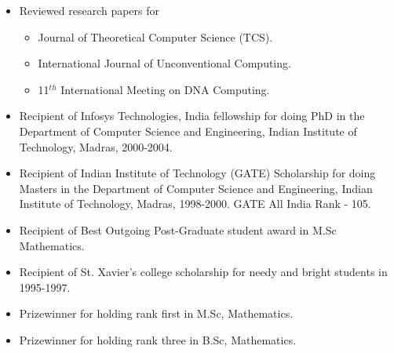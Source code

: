 \documentclass[11pt]{article}
\begin{document}
\begin{itemize}
\item Reviewed research papers for 
\begin{itemize}
\item Journal of Theoretical Computer Science (TCS).
\item International Journal of Unconventional Computing.
\item 11$^{th}$ International Meeting on DNA Computing. 
\end{itemize}
\item Recipient of Infosys Technologies, India fellowship for doing
PhD in the Department of Computer Science and Engineering, Indian
Institute of Technology, Madras, 2000-2004.
\item Recipient of Indian Institute of Technology (GATE) Scholarship
for doing Masters in the Department of Computer Science and
Engineering, Indian Institute of Technology, Madras, 1998-2000. GATE
All India Rank - 105.
\item Recipient of Best Outgoing Post-Graduate student award in M.Sc Mathematics.
\item Recipient of St. Xavier's college scholarship for needy and bright students in 1995-1997.
\item Prizewinner for holding rank first in M.Sc, Mathematics.
\item Prizewinner for holding rank three in B.Sc, Mathematics.
\end{itemize}


\vspace{0.1cm}
\end{document}
